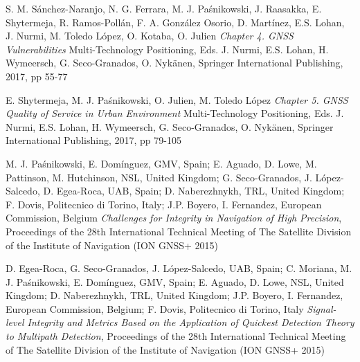 \documentclass[english,a4paper]{europasscv}
\begin{document}
\begin{europasscv}

\pagebreak

{S. M. Sánchez-Naranjo, N. G. Ferrara, M. J. Paśnikowski, J. Raasakka, E. Shytermeja, R. Ramos-Pollán, F. A. González Osorio, D. Martínez, E.S. Lohan, J. Nurmi, M. Toledo López, O. Kotaba, O. Julien \textit{Chapter 4. GNSS Vulnerabilities} Multi-Technology Positioning, Eds. J. Nurmi, E.S. Lohan, H. Wymeersch, G. Seco-Granados, O. Nykänen, Springer International Publishing, 2017, pp 55-77

E. Shytermeja, M. J. Paśnikowski, O. Julien,  M. Toledo López   \textit{Chapter 5. GNSS Quality of Service in Urban Environment} Multi-Technology Positioning, Eds. J. Nurmi, E.S. Lohan, H. Wymeersch, G. Seco-Granados, O. Nykänen, Springer International Publishing, 2017, pp 79-105

M. J. Paśnikowski, E. Domínguez, GMV, Spain; E. Aguado, D. Lowe, M. Pattinson, M. Hutchinson, NSL, United Kingdom; G. Seco-Granados, J. López-Salcedo, D. Egea-Roca, UAB, Spain; D. Naberezhnykh, TRL, United Kingdom; F. Dovis, Politecnico di Torino, Italy; J.P. Boyero, I. Fernandez, European Commission, Belgium \textit{Challenges for Integrity in Navigation of High Precision}, Proceedings of the 28th International Technical Meeting of The Satellite Division of the Institute of Navigation (ION GNSS+ 2015)

D. Egea-Roca, G. Seco-Granados, J. López-Salcedo, UAB, Spain; C. Moriana, M. J. Paśnikowski, E. Domínguez, GMV, Spain; E. Aguado, D. Lowe, NSL, United Kingdom; D. Naberezhnykh, TRL, United Kingdom; J.P. Boyero, I. Fernandez, European Commission, Belgium; F. Dovis, Politecnico di Torino, Italy \textit{Signal-level Integrity and Metrics Based on the Application of Quickest Detection Theory to Multipath Detection}, Proceedings of the 28th International Technical Meeting of The Satellite Division of the Institute of Navigation (ION GNSS+ 2015)

}
\end{europasscv}
\end{document}
